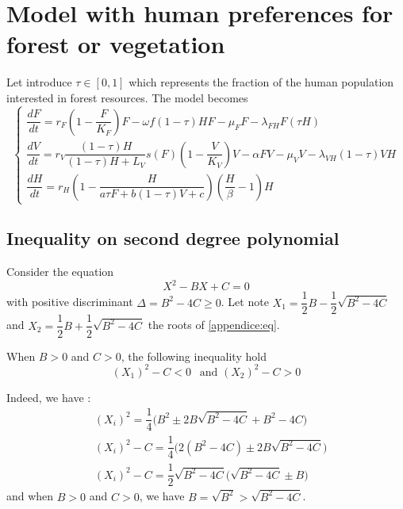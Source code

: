 \documentclass{article}
\begin{document}
\section{Model with human preferences for forest or vegetation}
Let introduce $\tau \in [0,1]$ which represents the fraction of the human population interested in forest resources. The model becomes
\begin{equation}    
\left\{ \begin{array}{l}
\dfrac{dF}{dt}=r_{F}\left(1-\dfrac{F}{K_{F}}\right)F-\omega f (1-\tau) H F - \mu_F F -\lambda_{FH} F (\tau H) \\
\dfrac{dV}{dt}=r_V \dfrac{(1-\tau)H}{(1-\tau)H + L_V} s(F) \left(1-\dfrac{V}{K_{V}}\right)V -\alpha FV-\mu_V V -\lambda_{VH} (1-\tau) V H\\
\dfrac{dH}{dt}=r_H \left(1-\dfrac{H}{a\tau F + b(1-\tau)V + c} \right) (\dfrac{H}{\beta} - 1) H
\end{array}\right.
\label{model}
\end{equation}

\begin{appendices}
\section{Inequality on second degree polynomial \label{appendice:ineq2nd}}

Consider the equation
\begin{equation}
X^2 - B X + C = 0
\label{appendice:eq}
\end{equation}
with positive discriminant $\Delta = B^2 - 4C \geq 0$. Let note $X_{1} = \dfrac{1}{2}B - \dfrac{1}{2} \sqrt{B^2 - 4 C}$ and $X_2 = \dfrac{1}{2}B + \dfrac{1}{2} \sqrt{B^2 - 4 C}$  the roots of \eqref{appendice:eq}.

When $B > 0$ and $C >0$, the following inequality hold
\begin{equation}
(X_1) ^ 2 - C < 0 \:\:\text{ and } (X_2)^2 - C > 0
\end{equation}

Indeed, we have :
\begin{subequations}
\begin{align}
&(X_i) ^2 = \dfrac{1}{4} \Big(B^2 \pm 2 B\sqrt{B^2 - 4C} + B^2 - 4C \Big) \\
&(X_i)^2 - C = \dfrac{1}{4} \Big(2(B^2 - 4C) \pm 2B \sqrt{B^2 - 4C} \Big) \\
&(X_i)^2 - C = \dfrac{1}{2} \sqrt{B^2 - 4C} \Big( \sqrt{B^2 - 4C} \pm B \Big)
\end{align}
\end{subequations}
and when $B > 0$ and $C>0$, we have $B = \sqrt{B^2} > \sqrt{B^2 - 4C}$.




\end{appendices}



\end{document}
